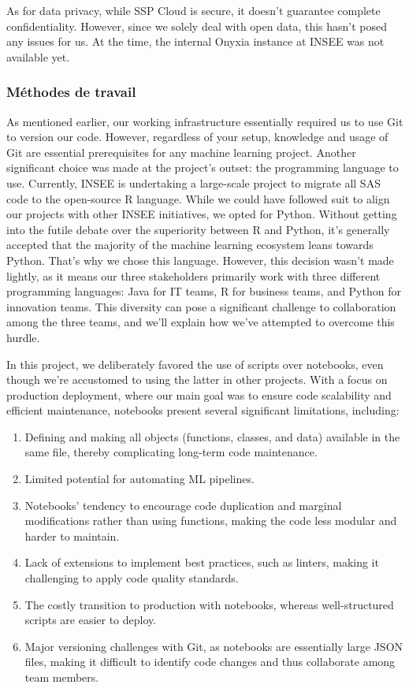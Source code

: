 As for data privacy, while SSP Cloud is secure, it doesn't guarantee complete confidentiality. However, since we solely deal with open data, this hasn't posed any issues for us. At the time, the internal Onyxia instance at INSEE was not available yet.

\subsubsection{Méthodes de travail}

As mentioned earlier, our working infrastructure essentially required us to use Git to version our code. However, regardless of your setup, knowledge and usage of Git are essential prerequisites for any machine learning project. Another significant choice was made at the project's outset: the programming language to use. Currently, INSEE is undertaking a large-scale project to migrate all SAS code to the open-source R language. While we could have followed suit to align our projects with other INSEE initiatives, we opted for Python. Without getting into the futile debate over the superiority between R and Python, it's generally accepted that the majority of the machine learning ecosystem leans towards Python. That's why we chose this language. However, this decision wasn't made lightly, as it means our three stakeholders primarily work with three different programming languages: Java for IT teams, R for business teams, and Python for innovation teams. This diversity can pose a significant challenge to collaboration among the three teams, and we'll explain how we've attempted to overcome this hurdle.

In this project, we deliberately favored the use of scripts over notebooks, even though we're accustomed to using the latter in other projects. With a focus on production deployment, where our main goal was to ensure code scalability and efficient maintenance, notebooks present several significant limitations, including:

\begin{enumerate}
    \item Defining and making all objects (functions, classes, and data) available in the same file, thereby complicating long-term code maintenance.
    \item Limited potential for automating ML pipelines.
    \item Notebooks' tendency to encourage code duplication and marginal modifications rather than using functions, making the code less modular and harder to maintain.
    \item Lack of extensions to implement best practices, such as linters, making it challenging to apply code quality standards.
    \item The costly transition to production with notebooks, whereas well-structured scripts are easier to deploy.
    \item Major versioning challenges with Git, as notebooks are essentially large JSON files, making it difficult to identify code changes and thus collaborate among team members.
\end{enumerate}

